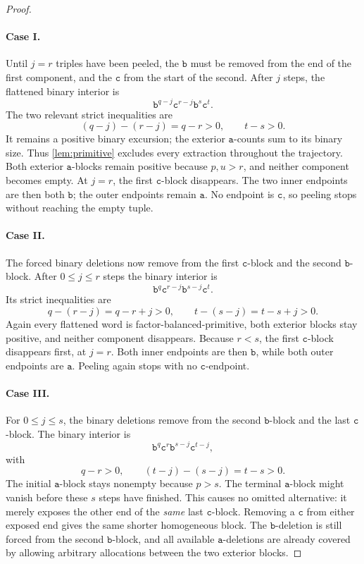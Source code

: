 \documentclass[11pt,letterpaper]{article}
\numberwithin{equation}{section}
\theoremstyle{definition}
\theoremstyle{remark}
\renewcommand{\aa}{\mathtt a}
\newcommand{\bb}{\mathtt b}
\newcommand{\cc}{\mathtt c}
\begin{document}
\begin{proof}
\paragraph{Case I.}
Until \(j=r\) triples have been peeled, the \(\bb\) must be removed
from the end of the first component, and the \(\cc\) from the start
of the second. After \(j\) steps, the flattened binary interior is
\[
  \bb^{q-j}\cc^{r-j}\bb^s\cc^t.
\]
The two relevant strict inequalities are
\[
 (q-j)-(r-j)=q-r>0,\qquad t-s>0.
\]
It remains a positive binary excursion; the exterior \(\aa\)-counts
sum to its binary size. Thus \cref{lem:primitive} excludes every
extraction throughout the trajectory. Both exterior \(\aa\)-blocks
remain positive because \(p,u>r\), and neither component becomes
empty. At \(j=r\), the first \(\cc\)-block disappears. The two inner
endpoints are then both \(\bb\); the outer endpoints remain
\(\aa\). No endpoint is \(\cc\), so peeling stops without reaching
the empty tuple.

\paragraph{Case II.}
The forced binary deletions now remove from the first \(\cc\)-block
and the second \(\bb\)-block. After \(0\leq j\leq r\) steps the
binary interior is
\[
  \bb^q\cc^{r-j}\bb^{s-j}\cc^t.
\]
Its strict inequalities are
\[
 q-(r-j)=q-r+j>0,\qquad t-(s-j)=t-s+j>0.
\]
Again every flattened word is factor-balanced-primitive, both exterior
blocks stay positive, and neither component disappears. Because
\(r<s\), the first \(\cc\)-block disappears first, at \(j=r\).
Both inner endpoints are then \(\bb\), while both outer endpoints
are \(\aa\). Peeling again stops with no \(\cc\)-endpoint.

\paragraph{Case III.}
For \(0\leq j\leq s\), the binary deletions remove from the second
\(\bb\)-block and the last \(\cc\)-block. The binary interior is
\[
  \bb^q\cc^r\bb^{s-j}\cc^{t-j},
\]
with
\[
 q-r>0,\qquad (t-j)-(s-j)=t-s>0.
\]
The initial \(\aa\)-block stays nonempty because \(p>s\). The
terminal \(\aa\)-block might vanish before these \(s\) steps have
finished. This causes no omitted alternative: it merely exposes the
other end of the \emph{same} last \(\cc\)-block. Removing a \(\cc\)
from either exposed end gives the same shorter homogeneous block.
The \(\bb\)-deletion is still forced from the second \(\bb\)-block,
and all available \(\aa\)-deletions are already covered by allowing
arbitrary allocations between the two exterior blocks.


\end{proof}
\end{document}
